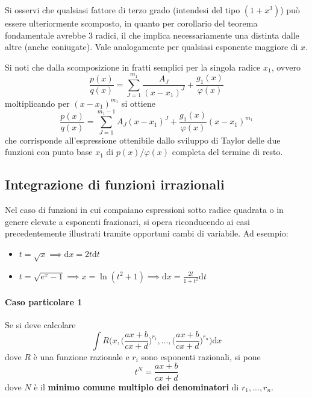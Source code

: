 \documentclass[10pt]{article}
\theoremstyle{plain}
\begin{document}
Si osservi che qualsiasi fattore di terzo grado (intendesi del tipo $(1 + x^3)$) può essere ulteriormente scomposto, in quanto per corollario del teorema fondamentale avrebbe 3 radici, il che implica necessariamente una distinta dalle altre (anche coniugate). Vale analogamente per qualsiasi esponente maggiore di $x$.

\begin{oss}
    Si noti che dalla scomposizione in fratti semplici per la singola radice $x_1$, ovvero
    \[\frac{p(x)}{q(x)} = \sum \limits_{J = 1}^{m_1}\frac{A_J}{(x-x_1)^J} + \frac{g_1(x)}{\varphi(x)}\]
    moltiplicando per $(x - x_1)^{m_1}$ si ottiene
    \[\frac{p(x)}{q(x)} = \sum \limits_{J = 1}^{m_1-1}A_J(x-x_1)^J + \frac{g_1(x)}{\varphi(x)}(x - x_1)^{m_1}\]
    che corrisponde all'espressione ottenibile dallo sviluppo di Taylor delle due funzioni con punto base $x_1$ di $p(x)\big/ \varphi(x)$ completa del termine di resto.
\end{oss}

\subsection{Integrazione di funzioni irrazionali}
Nel caso di funzioni in cui compaiano espressioni sotto radice quadrata o in genere elevate a esponenti frazionari, si opera riconducendo ai casi precedentemente illustrati tramite opportuni cambi di variabile. Ad esempio:
\begin{itemize}
\item $\displaystyle t = \sqrt{x} \implies \textrm{d}x = 2 t \textrm{d}t$
\item $\displaystyle t = \sqrt{e^x - 1} \implies x = \ln(t^2 +1) \implies \textrm{d}x = \frac{2t}{1+t^2}\textrm{d}t$
\end{itemize}
\paragraph{Caso particolare 1}
Se si deve calcolare
\[\int R\bigg(x, \big(\frac{ax + b}{cx + d}\big)^{r_1}, ..., \big(\frac{ax + b}{cx + d}\big)^{r_n} \bigg)\textrm{d}x\]
dove $R$ è una funzione razionale e $r_i$ sono esponenti razionali, si pone
\[t^N = \frac{ax+b}{cx+d}\]
dove $N$ è il \textbf{minimo comune multiplo dei denominatori} di $r_1, ..., r_n$.
\end{document}
